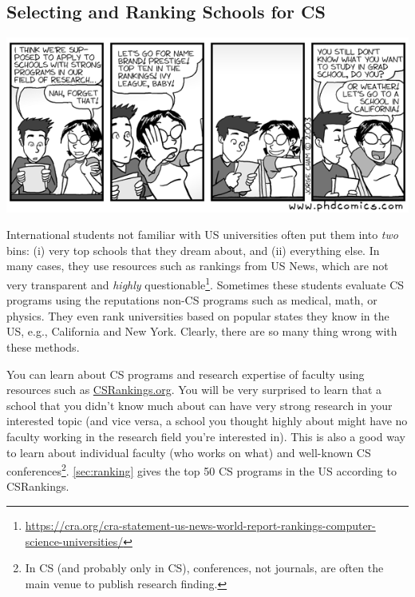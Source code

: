 \documentclass[oneside,11pt]{memoir}
\begin{document}

\subsection{Selecting and Ranking Schools for CS}\label{sec:selecting-ranking-schools}
\begin{center}
  \includegraphics[scale=0.5]{files/c1.png}
\end{center}

International students not familiar with US universities often put them into \emph{two} bins:  (i) very top schools that they dream about, and (ii) everything else.  In many cases, they use resources such as rankings from US News, which are not very transparent and \emph{highly} questionable\footnote{\url{https://cra.org/cra-statement-us-news-world-report-rankings-computer-science-universities/}}.  Sometimes these students evaluate CS programs using the reputations non-CS programs such as medical, math, or physics.
They even rank universities based on popular states they know in the US, e.g., California and New York.  Clearly, there are so many thing wrong with these methods. 

You can learn about CS programs and research expertise of faculty using resources such as \href{https://csrankings.org}{CSRankings.org}. You will be very surprised to learn that a school that you didn't know much about can have very strong research in your interested topic (and vice versa, a school you thought highly about might have no faculty working in the research field you're interested in). This is also a good way to learn about individual faculty (who works on what) and well-known CS conferences\footnote{In CS (and probably only in CS), conferences, not journals, are often the main venue to publish research finding.}. \autoref{sec:ranking} gives the top 50 CS programs in the US according to CSRankings.
\end{document}
